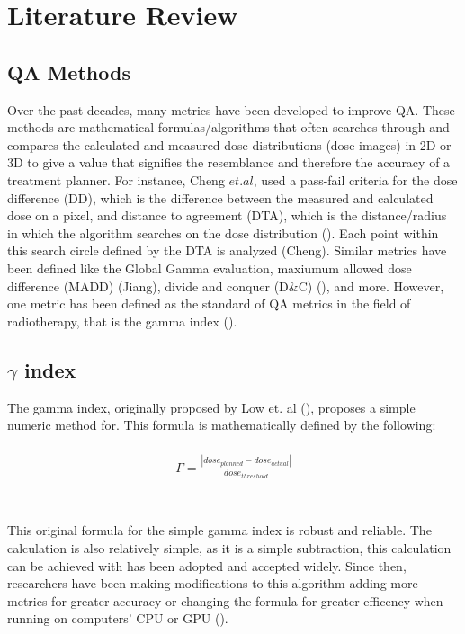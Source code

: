 \documentclass[12pt]{article}
\begin{document}
\section{Literature Review}
\subsection{QA Methods}
Over the past decades, many metrics have been developed to improve QA. These methods are mathematical formulas/algorithms that often searches through and compares the calculated and measured dose distributions (dose images) in 2D or 3D to give a value that signifies the resemblance and therefore the accuracy of a treatment planner. For instance, Cheng $et. al$, used a pass-fail criteria for the dose difference (DD), which is the difference between the measured and calculated dose on a pixel, and distance to agreement (DTA), which is the distance/radius in which the algorithm searches on the dose distribution (\textcite{Cheng}). Each point within this search circle defined by the DTA is analyzed (Cheng). Similar metrics have been defined like the Global Gamma evaluation, maxiumum allowed dose difference (MADD) (Jiang), divide and conquer (D\&C) (\textcite{Stojadinovic}), and more. However, one metric has been defined as the standard of QA metrics in the field of radiotherapy, that is the gamma index (\textcite{Low}).

\subsection{$\gamma$ index}
The gamma index, originally proposed by Low et. al (\textcite{Low}), proposes a simple numeric method for. This formula is mathematically defined by the following:
\\
\\
\begin{align}
  \Gamma = \frac{|dose_{planned} - dose_{actual}|}{dose_{threshold}} \\
\end{align}
\\
\\
This original formula for the simple gamma index is robust and reliable. The calculation is also relatively simple, as it is a simple subtraction, this calculation can be achieved with has been adopted and accepted widely. Since then, researchers have been making modifications to this algorithm adding more metrics for greater accuracy or changing the formula for greater efficency when running on computers' CPU or GPU (\textcite{Gu}).
\end{document}
